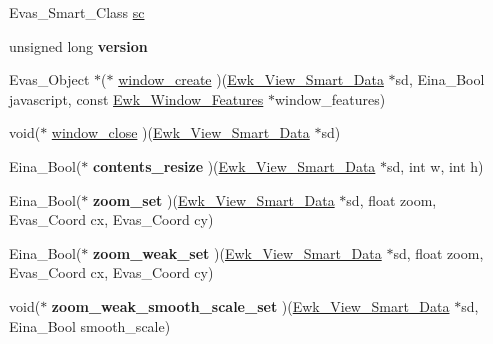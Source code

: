 \begin{DoxyCompactItemize}
\item 
Evas\+\_\+\+Smart\+\_\+\+Class \hyperlink{struct__Ewk__View__Smart__Class_a02f459baba6f2dfaea30b89a536565fc}{sc}
\item 
\hypertarget{struct__Ewk__View__Smart__Class_ae5257235e08dda975f0dca01f3ece792}{unsigned long {\bfseries version}}\label{struct__Ewk__View__Smart__Class_ae5257235e08dda975f0dca01f3ece792}

\item 
Evas\+\_\+\+Object $\ast$($\ast$ \hyperlink{struct__Ewk__View__Smart__Class_a9d7f52e3cb15ab9ea6b4b0ff4747a0fc}{window\+\_\+create} )(\hyperlink{ewk__view_8h_a9a4bd081861301f6c55cb5da384dfc7d}{Ewk\+\_\+\+View\+\_\+\+Smart\+\_\+\+Data} $\ast$sd, Eina\+\_\+\+Bool javascript, const \hyperlink{ewk__window__features_8h_af32c782291330d29e9f355daf530b22e}{Ewk\+\_\+\+Window\+\_\+\+Features} $\ast$window\+\_\+features)
\item 
void($\ast$ \hyperlink{struct__Ewk__View__Smart__Class_a31f6ed4872b25f49c501f6b40f00c92f}{window\+\_\+close} )(\hyperlink{ewk__view_8h_a9a4bd081861301f6c55cb5da384dfc7d}{Ewk\+\_\+\+View\+\_\+\+Smart\+\_\+\+Data} $\ast$sd)
\item 
\hypertarget{struct__Ewk__View__Smart__Class_ab8a523117168364c4da1995d78b3d465}{Eina\+\_\+\+Bool($\ast$ {\bfseries contents\+\_\+resize} )(\hyperlink{ewk__view_8h_a9a4bd081861301f6c55cb5da384dfc7d}{Ewk\+\_\+\+View\+\_\+\+Smart\+\_\+\+Data} $\ast$sd, int w, int h)}\label{struct__Ewk__View__Smart__Class_ab8a523117168364c4da1995d78b3d465}

\item 
\hypertarget{struct__Ewk__View__Smart__Class_a3d24e01d77238c4a546667f5e32e9f05}{Eina\+\_\+\+Bool($\ast$ {\bfseries zoom\+\_\+set} )(\hyperlink{ewk__view_8h_a9a4bd081861301f6c55cb5da384dfc7d}{Ewk\+\_\+\+View\+\_\+\+Smart\+\_\+\+Data} $\ast$sd, float zoom, Evas\+\_\+\+Coord cx, Evas\+\_\+\+Coord cy)}\label{struct__Ewk__View__Smart__Class_a3d24e01d77238c4a546667f5e32e9f05}

\item 
\hypertarget{struct__Ewk__View__Smart__Class_af0e46a7e1fe43fb66806b079a6a6105a}{Eina\+\_\+\+Bool($\ast$ {\bfseries zoom\+\_\+weak\+\_\+set} )(\hyperlink{ewk__view_8h_a9a4bd081861301f6c55cb5da384dfc7d}{Ewk\+\_\+\+View\+\_\+\+Smart\+\_\+\+Data} $\ast$sd, float zoom, Evas\+\_\+\+Coord cx, Evas\+\_\+\+Coord cy)}\label{struct__Ewk__View__Smart__Class_af0e46a7e1fe43fb66806b079a6a6105a}

\item 
\hypertarget{struct__Ewk__View__Smart__Class_aa5d994daa01afa0d21e2d52298aab6e0}{void($\ast$ {\bfseries zoom\+\_\+weak\+\_\+smooth\+\_\+scale\+\_\+set} )(\hyperlink{ewk__view_8h_a9a4bd081861301f6c55cb5da384dfc7d}{Ewk\+\_\+\+View\+\_\+\+Smart\+\_\+\+Data} $\ast$sd, Eina\+\_\+\+Bool smooth\+\_\+scale)}\label{struct__Ewk__View__Smart__Class_aa5d994daa01afa0d21e2d52298aab6e0}


\end{DoxyCompactItemize}
